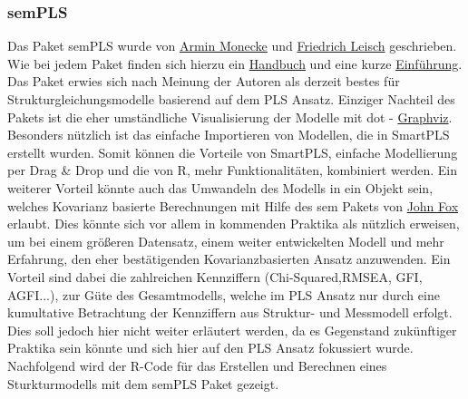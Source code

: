 \documentclass{article}\usepackage[]{graphicx}\usepackage[]{color}
\begin{document}
\subsubsection{semPLS}
Das Paket semPLS\cite{semPLS} wurde von \href{Armin.Monecke@stat.uni-muenchen.de}{Armin Monecke} und \href{Friedrich.Leisch@R-project.org}{Friedrich Leisch} geschrieben. Wie bei jedem Paket finden sich hierzu ein \href{http://cran.r-project.org/web/packages/semPLS/semPLS.pdf}{Handbuch} und eine kurze \href{http://cran.r-project.org/web/packages/semPLS/vignettes/semPLS-intro.pdf}{Einführung}.\\
Das Paket erwies sich nach Meinung der Autoren als derzeit bestes für Strukturgleichungsmodelle basierend auf dem PLS Ansatz. Einziger Nachteil des Pakets ist die eher umständliche Visualisierung der Modelle mit dot - \href{http://www.graphviz.org/}{Graphviz}. Besonders nützlich ist das einfache Importieren von Modellen, die in SmartPLS erstellt wurden. Somit können die Vorteile von SmartPLS, einfache Modellierung per Drag \& Drop und die von R, mehr Funktionalitäten, kombiniert werden. Ein weiterer Vorteil könnte auch das Umwandeln des Modells in ein Objekt sein, welches Kovarianz basierte Berechnungen mit Hilfe des sem Pakets von \href{jfox@mcmaster.ca}{John Fox} erlaubt. Dies könnte sich vor allem in kommenden Praktika als nützlich erweisen, um bei einem größeren Datensatz, einem weiter entwickelten Modell und mehr Erfahrung, den eher bestätigenden Kovarianzbasierten Ansatz anzuwenden. Ein Vorteil sind dabei die zahlreichen Kennziffern (Chi-Squared,RMSEA, GFI, AGFI...), zur Güte des Gesamtmodells, welche im PLS Ansatz nur durch eine kumultative Betrachtung der Kennziffern aus Struktur- und Messmodell erfolgt. Dies soll jedoch hier nicht weiter erläutert werden, da es Gegenstand zukünftiger Praktika sein könnte und sich hier auf den PLS Ansatz fokussiert wurde. Nachfolgend wird der R-Code für das Erstellen und Berechnen eines Sturkturmodells mit dem semPLS Paket gezeigt.
\end{document}
